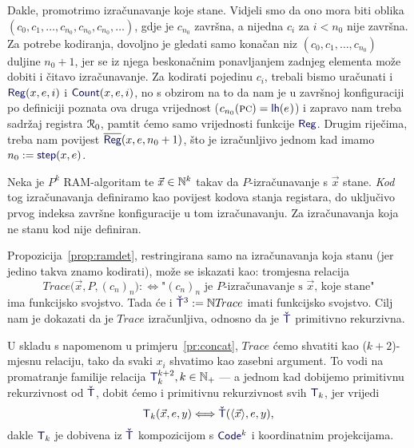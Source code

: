 Dakle, promotrimo izračunavanje koje stane. Vidjeli smo da ono mora biti oblika $(c_0,c_1,\dotsc,c_{n_0},c_{n_0},c_{n_0},\dotsc)$, gdje je $c_{n_0}$ završna, a nijedna $c_i$ za $i<n_0$ nije završna. Za potrebe kodiranja, dovoljno je gledati samo konačan niz $(c_0,c_1,\dotsc,c_{n_0})$ duljine $n_0+1$, jer se iz njega beskonačnim ponavljanjem zadnjeg elementa može dobiti i čitavo izračunavanje. Za kodirati pojedinu $c_i$, trebali bismo uračunati i $\f{Reg}(x,e,i)$ i $\f{Count}(x,e,i)$, no s obzirom na to da nam je u završnoj konfiguraciji po definiciji poznata ova druga vrijednost ($c_{n_0}(\textsc{pc})=\f{lh}(e\mspace{1mu})$) i zapravo nam treba sadržaj registra $\mathcal R_{0}$, pamtit ćemo samo vrijednosti funkcije $\f{Reg}$. Drugim riječima, treba nam povijest $\overline{\f{Reg}}(x,e,n_0+1)$, što je izračunljivo jednom kad imamo $n_0:=\f{step}(x,e)$.

\begin{definicija}[{name=[kod izračunavanja]}]\label{def:kodizr}
Neka je $P^k$ RAM-algoritam te $\vec x\in{\mathbb N}^k$ takav da $P$-izračunavanje s $\vec x$ stane. \emph{Kod} tog izračunavanja definiramo kao povijest kodova stanja registara, do uključivo prvog indeksa završne konfiguracije u tom izračunavanju. Za izračunavanja koja ne stanu kod nije definiran.
\end{definicija}

Propozicija~\ref{prop:ramdet}, restringirana samo na izračunavanja koja stanu (jer jedino takva znamo kodirati), može se iskazati kao: tromjesna relacija \begin{equation}\label{eq:Trace}
    T\!race\bigl(\vec x,P,(c_n)_n\bigr):\Longleftrightarrow\text{"$(c_n)_n$ je $P$-izračunavanje s $\vec x$, koje stane"}
\end{equation}
ima funkcijsko svojstvo. Tada će i $\f{\check T}^3:=\N T\!race$ imati funkcijsko svojstvo. Cilj nam je dokazati da je $T\!race$ izračunljiva, odnosno da je $\f{\check T}$ primitivno rekurzivna.

U skladu s napomenom u primjeru~\ref{pr:concat}, $T\!race$ ćemo shvatiti kao ($k+2$)-mjesnu relaciju, tako da svaki $x_i$ shvatimo kao zasebni argument. To vodi na promatranje familije relacija $\f T_k^{k+2},k\in\N_+$ --- a jednom kad dobijemo primitivnu rekurzivnost od $\f{\check T}$, dobit ćemo i primitivnu rekurzivnost svih $\f T_k$, jer vrijedi
\begin{equation}\label{eq:TkviadotT}
\f T_k(\vec x,e,y)\Longleftrightarrow\f{\check T}(\langle\vec x\rangle,e,y)\text,
\end{equation}
dakle $\f T_k$ je dobivena iz $\f{\check T}$ kompozicijom s $\f{Code}^k$ i koordinatnim projekcijama.

